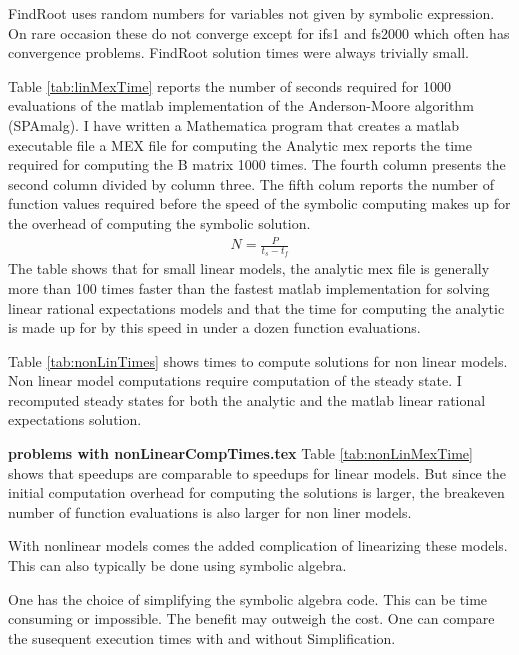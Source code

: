 \documentclass[12pt]{article}
\begin{document}
FindRoot uses random numbers for variables not given by symbolic expression.
On rare occasion these do not converge except for ifs1 and fs2000
 which often has convergence problems. 
FindRoot solution times were always trivially small.



Table \ref{tab:linMexTime} reports the number of seconds required for 1000 evaluations of
the matlab implementation of the Anderson-Moore algorithm (SPAmalg).
I have written a Mathematica program that creates a matlab executable file
a MEX file for computing the
Analytic mex reports the time required for computing the B matrix 1000 times.
The fourth column presents  the second column  divided by column three.
The fifth colum reports 
the number of function values required before the speed of the
symbolic computing makes up for the overhead of
computing the symbolic solution.
\begin{gather*}
  N=\frac{P}{t_s-t_f}
\end{gather*}
The table shows that for small linear models, 
the analytic mex file is generally more than 100 times
faster than the fastest matlab implementation for solving linear rational
expectations models and that the time for computing the analytic is
made up for by this speed in under a dozen function evaluations.





Table \ref{tab:nonLinTimes} shows times to compute solutions for non linear
models. Non linear model computations require computation of the steady state.
I recomputed steady states for both the analytic and the matlab linear 
rational expectations solution.



%
{\bf problems with {nonLinearCompTimes.tex}}
Table \ref{tab:nonLinMexTime} shows that
speedups are comparable to speedups for linear models. But since the 
initial computation overhead for computing the solutions is larger, the
breakeven number of function evaluations is also larger for non liner models.

    
With nonlinear models comes the added complication of linearizing these models.
This can also typically be done using symbolic algebra.

One has the choice of simplifying the symbolic algebra code. This can be
time consuming or impossible.  The benefit may outweigh the cost.
One can compare the susequent execution times with and without Simplification.
\end{document}
